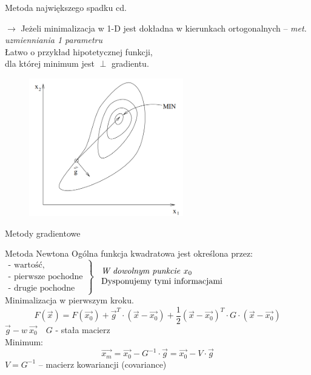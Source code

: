   \begin{frame}{Metoda największego spadku cd.}

    \begin{block}{}
      $\rightarrow$ Jeżeli minimalizacja w 1-D jest dokładna w kierunkach ortogonalnych -- \emph{met. uzmienniania 1 parametru}
      \smallskip
      \\Łatwo o przykład hipotetycznej funkcji,
      \\ dla której minimum jest $\perp$ gradientu.
  	\end{block}
    \begin{figure}
		\centering
		\includegraphics[height=0.5\textheight ,width=0.6\textwidth]{img/17/high_fall_met_2}
	\end{figure}

  \end{frame}

  \begin{frame}{Metody gradientowe}

    \begin{block}{Metoda Newtona}
      Ogólna funkcja kwadratowa jest określona przez:
      \\$\left.
        \begin{array}{l}
          \text{- wartość,} \\
          \text{- pierwsze pochodne} \\
          \text{- drugie pochodne}
	    \end{array}
	  \right\}$
	  $\begin{array}{l} \text{\emph{W dowolnym punkcie }} x_0 \\
     \text{Dysponujemy tymi informacjami} \end{array}$
	  \smallskip
	  \\Minimalizacja w pierwszym kroku.
	  \begin{displaymath}
	  		F(\vec{x}) = F(\vec{x_0}) + \vec{g}^T \cdot (\vec{x} - \vec{x_0}) +
	  		\frac{1}{2} (\vec{x} - \vec{x_0})^T \cdot G \cdot (\vec{x} - \vec{x_0})
	  \end{displaymath}
	  $\vec{g} - w \ \vec{x_0} \quad G$ -  stała macierz
	  \smallskip
	  \\Minimum:
	  \begin{displaymath}
	  		\vec{x_m} = \vec{x_0} - G^{-1} \cdot \vec{g} =  \vec{x_0} - V \cdot \vec{g}
	  \end{displaymath}
    $V = G^{-1}$ -- macierz kowariancji (covariance)
	\end{block}

  \end{frame}


